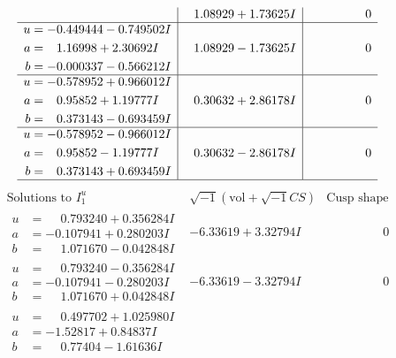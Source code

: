 \documentclass[1p]{elsarticle_modified}
\theoremstyle{definition}
\newcommand{\I}{\sqrt{-1}}
\begin{document}
$$\begin{array}{c|c|c}
 & \phantom{-}1.08929 + 1.73625 I & \phantom{-0.000000 } 0 \\ \hline\begin{aligned}
u &= -0.449444 - 0.749502 I \\
a &= \phantom{-}1.16998 + 2.30692 I \\
b &= -0.000337 - 0.566212 I\end{aligned}
 & \phantom{-}1.08929 - 1.73625 I & \phantom{-0.000000 } 0 \\ \hline\begin{aligned}
u &= -0.578952 + 0.966012 I \\
a &= \phantom{-}0.95852 + 1.19777 I \\
b &= \phantom{-}0.373143 - 0.693459 I\end{aligned}
 & \phantom{-}0.30632 + 2.86178 I & \phantom{-0.000000 } 0 \\ \hline\begin{aligned}
u &= -0.578952 - 0.966012 I \\
a &= \phantom{-}0.95852 - 1.19777 I \\
b &= \phantom{-}0.373143 + 0.693459 I\end{aligned}
 & \phantom{-}0.30632 - 2.86178 I & \phantom{-0.000000 } 0\\
 \hline 
 \end{array}$$\newpage$$\begin{array}{c|c|c}  
\text{Solutions to }I^u_{1}& \I (\text{vol} + \sqrt{-1}CS) & \text{Cusp shape}\\
 \hline 
\begin{aligned}
u &= \phantom{-}0.793240 + 0.356284 I \\
a &= -0.107941 + 0.280203 I \\
b &= \phantom{-}1.071670 - 0.042848 I\end{aligned}
 & -6.33619 + 3.32794 I & \phantom{-0.000000 } 0 \\ \hline\begin{aligned}
u &= \phantom{-}0.793240 - 0.356284 I \\
a &= -0.107941 - 0.280203 I \\
b &= \phantom{-}1.071670 + 0.042848 I\end{aligned}
 & -6.33619 - 3.32794 I & \phantom{-0.000000 } 0 \\ \hline\begin{aligned}
u &= \phantom{-}0.497702 + 1.025980 I \\
a &= -1.52817 + 0.84837 I \\
b &= \phantom{-}0.77404 - 1.61636 I\end{aligned}

\end{array}$$
\end{document}
